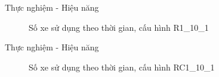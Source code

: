 \begin{frame}{Thực nghiệm - Hiệu năng}
  \begin{figure}
    \centering
    \quad
  \caption{Số xe sử dụng theo thời gian, cấu hình R1\_10\_1}
  \end{figure}
\end{frame}

\begin{frame}{Thực nghiệm - Hiệu năng}
  \begin{figure}
    \centering
    \quad
  \caption{Số xe sử dụng theo thời gian, cấu hình RC1\_10\_1}
  \end{figure}
\end{frame}

